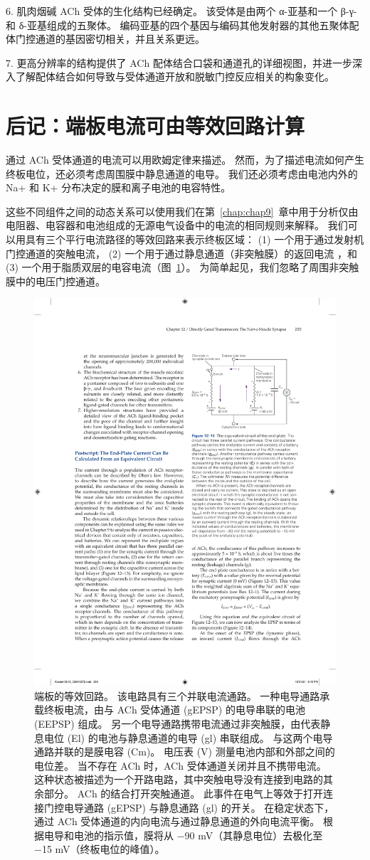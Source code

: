 6. 肌肉烟碱 ACh 受体的生化结构已经确定。
该受体是由两个 α-亚基和一个 β-γ-和 δ-亚基组成的五聚体。
编码亚基的四个基因与编码其他发射器的其他五聚体配体门控通道的基因密切相关，并且关系更远。 


7. 更高分辨率的结构提供了 ACh 配体结合口袋和通道孔的详细视图，并进一步深入了解配体结合如何导致与受体通道开放和脱敏门控反应相关的构象变化。


\section{后记：端板电流可由等效回路计算}

通过 ACh 受体通道的电流可以用欧姆定律来描述。
然而，为了描述电流如何产生终板电位，还必须考虑周围膜中静息通道的电导。
我们还必须考虑由电池内外的 Na+ 和 K+ 分布决定的膜和离子电池的电容特性。


这些不同组件之间的动态关系可以使用我们在第~\ref{chap:chap9}~章中用于分析仅由电阻器、电容器和电池组成的无源电气设备中的电流的相同规则来解释。
我们可以用具有三个平行电流路径的等效回路来表示终板区域：
(1) 一个用于通过发射机门控通道的突触电流，
(2) 一个用于通过静息通道（非突触膜）的返回电流 ，和 
(3) 一个用于脂质双层的电容电流（图~\ref{fig:12_13}）。 
为简单起见，我们忽略了周围非突触膜中的电压门控通道。


\begin{figure}[htbp]
	\centering
	\includegraphics[width=0.5\linewidth]{chap12/fig_12_13}
	\caption{端板的等效回路。 该电路具有三个并联电流通路。 一种电导通路承载终板电流，由与 ACh 受体通道 (gEPSP) 的电导串联的电池 (EEPSP) 组成。 另一个电导通路携带电流通过非突触膜，由代表静息电位 (El) 的电池与静息通道的电导 (gl) 串联组成。 与这两个电导通路并联的是膜电容 (Cm)。 电压表 (V) 测量电池内部和外部之间的电位差。 当不存在 ACh 时，ACh 受体通道关闭并且不携带电流。 这种状态被描述为一个开路电路，其中突触电导没有连接到电路的其余部分。 ACh 的结合打开突触通道。 此事件在电气上等效于打开连接门控电导通路 (gEPSP) 与静息通路 (gl) 的开关。 在稳定状态下，通过 ACh 受体通道的内向电流与通过静息通道的外向电流平衡。 根据电导和电池的指示值，膜将从 −90 mV（其静息电位）去极化至 −15 mV（终板电位的峰值）。}
	\label{fig:12_13}
\end{figure}


